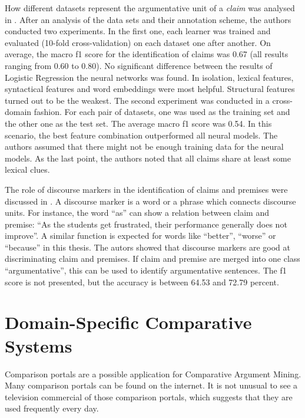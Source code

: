 How different datasets represent the argumentative unit of a \emph{claim} was analysed in \cite{Daxenberger2017What-is-the-Ess}. After an analysis of the data sets and their annotation scheme, the authors conducted two experiments.
In the first one, each learner was trained and evaluated (10-fold cross-validation) on each dataset one after another. On average, the macro f1 score for the identification of claims was 0.67 (all results ranging from 0.60 to 0.80). No significant difference between the results of Logistic Regression the neural networks was found. In isolation, lexical features, syntactical features and word embeddings were most helpful. Structural features turned out to be the weakest.
The second experiment was conducted in a cross-domain fashion. For each pair of datasets, one was used as the training set and the other one as the test set. The average macro f1 score was 0.54. In this scenario, the best feature combination outperformed all neural models. The authors assumed that there might not be enough training data for the neural models.
As the last point, the authors noted that all claims share at least some lexical clues.


The role of discourse markers in the identification of claims and premises were discussed in \cite{Eckle-Kohler2015On-the-Role-of-}. A discourse marker is a word or a phrase which connects discourse units. For instance, the word \enquote{as} can show a relation between claim and premise: \enquote{As the students get frustrated, their performance generally does not improve}.  A similar function is expected for words like \enquote{better}, \enquote{worse} or \enquote{because} in this thesis. The autors showed that discourse markers are good at discriminating claim and premises. If claim and premise are merged into one class \enquote{argumentative}, this can be used to identify argumentative sentences. The f1 score is not presented, but the accuracy is between 64.53 and 72.79 percent.



\section{Domain-Specific Comparative Systems}
\label{sec:domainspec}

Comparison portals are a possible application for Comparative Argument Mining. Many comparison portals can be found on the internet. It is not unusual to see a television commercial of those comparison portals, which suggests that they are used frequently every day.

